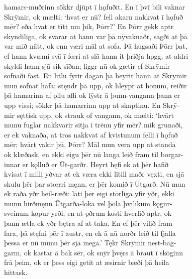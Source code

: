 \documentclass[12pt,letterpaper]{book}
\begin{document}
\begin{linenumbers}
hamars-muðrinn sökkr djūpt ī hǫfuðit.  En ī þvī bili vaknar\\
Skrȳmir, ok mælti: `hvat er nū? fell akarn nakkvat ī hǫfuð\\
mēr? eða hvat er tītt um þik, Þōrr?'  En Þōrr gekk aptr\\
skyndiliga, ok svarar at hann var þā nȳvaknaðr, sagði at þā\\
var mið nātt, ok enn væri māl at sofa.  Þā hugsaði Þōrr þat,\\
ef hann kvæmi svā ī fœri at slā hann it þriðja hǫgg, at aldri\\
skyldi hann sjā sik sīðan; liggr nū ok gætir ef Skrȳmir\\
sofnaði fast.  En lītlu fyrir dagan þā heyrir hann at Skrȳmir\\
mun sofnat hafa; stęndr þā upp, ok hleypr at honum, reiðir\\
þā hamarinn af ǫllu afli ok lȳstr ā þunn-vangann þann er\\
upp vissi; sökkr þā hamarrinn upp at skaptinu.  En Skrȳ-\\
mir sęttisk upp, ok strauk of vangann, ok mælti: `hvārt\\
munu fuglar nakkvarir sitja ī trēnu yfir mēr? mik grunaði,\\
er ek vaknaða, at tros nakkvat af kvistunum felli ī hǫfuð\\
mēr; hvārt vakir þū, Þōrr?  Māl mun vera upp at standa\\
ok klæðask, en ekki eigu þēr nū langa leið fram til borgar-\\
innar er kǫlluð er Ūt-garðr.  Heyrt hęfi ek at þēr hafið\\
kvisat ī milli yðvar at ek væra ekki lītill maðr vęxti, en sjā\\
skulu þēr þar stœrri męnn, er þēr komið ī Ūtgarð.  Nū mun\\
ek rāða yðr heil-ræði: lāti þēr eigi stōrliga yfir yðr, ekki\\
munu hirðmęnn Ūtgarða-loka vel þola þvīlīkum kǫgur-\\
sveinum kǫpur-yrði; en at ǫðrum kosti hverfið aptr, ok\\
þann ætla ek yðr bętra af at taka.  En ef þēr vilið fram\\
fara, þā stęfni þēr ī austr, en ek ā nū norðr leið til fjalla\\
þessa er nū munu þēr sjā mega.'  Tękr Skrȳmir nest-bag-\\
garm, ok kastar ā bak sēr, ok snȳr þvęrs ā braut ī skōginn\\
frā þeim, ok er þess eigi getit at æsirnir bæði þā heila\\
hittask.


\end{linenumbers}
\end{document}
